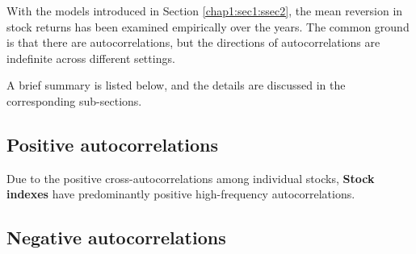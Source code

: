 With the models introduced in Section \ref{chap1:sec1:ssec2}, the mean reversion in stock returns
has been examined empirically over the years. The common ground is that there are autocorrelations,
but the directions of autocorrelations are indefinite across different settings.

A brief summary is listed below, and the details are discussed in the corresponding sub-sections.

\subsection{Positive autocorrelations}
Due to the positive cross-autocorrelations among individual stocks, \textbf{Stock indexes} have predominantly
positive high-frequency autocorrelations.



\subsection{Negative autocorrelations}

